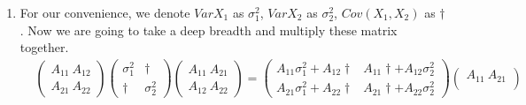 \documentclass[12pt,a4paper]{article}
\theoremstyle{definition}
\begin{document}
\begin{enumerate}[label=\roman*)]
\begin{proof}
        Of course, we can still multiply things together and still prove this formula. Assume that $A=\begin{pmatrix} A_{11} \ A_{12}\\ A_{21} \ A_{22}\end{pmatrix}$ and $X=\binom{x_1}{x_2}$. Then
        \begin{equation*}
            \begin{pmatrix}
                A_{11} \ A_{12}\\
                A_{21} \ A_{22}
            \end{pmatrix}
            \binom{x_1}{x_2}=\binom{A_{11}x_1+A_{12}x_2}{A_{21}x_1+A_{22}x_2}
        \end{equation*}
        And then
        \begin{equation*}
            E\binom{A_{11}x_1+A_{12}x_2}{A_{21}x_1+A_{22}x_2}=\binom{E(A_{11}x_1+A_{12}x_2)}{E(A_{21}x_1+A_{22}x_2)}=\binom{A_{11}E(x_1)+A_{12}E(x_2)}{A_{21}E(x_1)+A_{22}E(x_2)}=AE(X)
        \end{equation*}
    \end{proof}
    \item For our convenience, we denote $VarX_1$ as $\sigma_1^2$, $VarX_2$ as $\sigma_2^2$, $Cov(X_1,X_2)$ as $\dagger$. Now we are going to take a deep breadth and multiply these matrix together.
    \begin{equation*}
    \begin{split}
        &\begin{pmatrix}
            A_{11} \ A_{12}\\
            A_{21} \ A_{22}
        \end{pmatrix}
        \begin{pmatrix}
            \sigma_1^2 & \dagger\\
            \dagger & \sigma_2^2
        \end{pmatrix}
        \begin{pmatrix}
            A_{11} \ A_{21}\\
            A_{12} \ A_{22}
        \end{pmatrix}
        =
        \begin{pmatrix}
            A_{11}\sigma_1^2+A_{12}\dagger & A_{11}\dagger+A_{12}\sigma_2^2\\
            A_{21}\sigma_1^2+A_{22}\dagger & A_{21}\dagger+A_{22}\sigma_2^2
        \end{pmatrix}
        \begin{pmatrix}
            A_{11} \ A_{21}\\

\end{pmatrix}
\end{split}
\end{equation*}
\end{enumerate}
\end{document}
